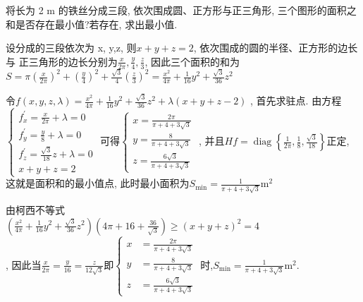 \documentclass[kindlepaper]{BHCexam4kindle}
\begin{document}
\begin{questions}
		\qs 将长为 2 m 的铁丝分成三段, 依次围成圆、正方形与正三角形, 三个图形的面积之
		和是否存在最小值?若存在, 求出最小值.
		\begin{solution}
			设分成的三段依次为 x, y,z, 则$x+y+z=2$, 依次围成的圆的半径、正方形的边长与
		正三角形的边长分别为$\frac{x}{2 \pi}, \frac{y}{4}, \frac{z}{3}$, 因此三个面积的和为\\
		$S=\pi\left(\frac{x}{2 \pi}\right)^{2}+\left(\frac{y}{4}\right)^{2}+\frac{\sqrt{3}}{4}\left(\frac{z}{3}\right)^{2}=\frac{x^{2}}{4 \pi}+\frac{1}{16} y^{2}+\frac{\sqrt{3}}{36} z^{2}$
		\end{solution}
		\begin{solution}
			令$f(x, y, z, \lambda)=\frac{x^{2}}{4 \pi}+\frac{1}{16} y^{2}+\frac{\sqrt{3}}{36} z^{2}+\lambda(x+y+z-2)$
			, 首先求驻点. 由方程$\left\{\begin{array}{l}{f_{x}^{\prime}=\frac{x}{2 \pi}+\lambda=0} \\ {f_{y}^{\prime}=\frac{y}{8}+\lambda=0} \\ {f_{z}^{\prime}=\frac{\sqrt{3}}{18} z+\lambda=0} \\ {x+y+z=2}\end{array}\right.$
				可得$\left\{\begin{array}{l}{x=\frac{2 \pi}{\pi+4+3 \sqrt{3}}} \\ {y=\frac{8}{\pi+4+3 \sqrt{3}}} \\ {z=\frac{6 \sqrt{3}}{\pi+4+3 \sqrt{3}}}\end{array}\right.$
					, 并且$H f=\operatorname{diag}\left\{\frac{1}{2 \pi}, \frac{1}{8}, \frac{\sqrt{3}}{18}\right\}$正定, 这就是面积和的最小值点, 此时最小面积为$S_{\min }=\frac{1}{\pi+4+3 \sqrt{3}} \mathrm{m}^{2}$
		\end{solution}
		\begin{solution}
			由柯西不等式\\
			$\left(\frac{x^{2}}{4 \pi}+\frac{1}{16} y^{2}+\frac{\sqrt{3}}{36} z^{2}\right)\left(4 \pi+16+\frac{36}{\sqrt{3}}\right) \geqslant(x+y+z)^{2}=4$\\
			, 因此当$\frac{x}{2 \pi}=\frac{y}{16}=\frac{z}{12 \sqrt{3}}$即$\left\{\begin{aligned} x &=\frac{2 \pi}{\pi+4+3 \sqrt{3}} \\ y &=\frac{8}{\pi+4+3 \sqrt{3}} \\ z &=\frac{6 \sqrt{3}}{\pi+4+3 \sqrt{3}} \end{aligned}\right.$
				时,$S_{\min }=\frac{1}{\pi+4+3 \sqrt{3}} \mathrm{m}^{2}$.
		\end{solution}


\end{questions}
\end{document}
